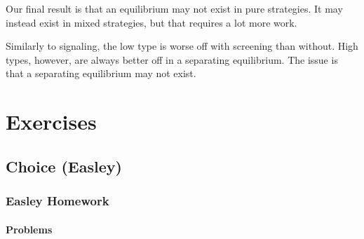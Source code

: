 \documentclass[12pt]{article}
\begin{document}
Our final result is that an equilibrium may not exist in pure strategies. It may instead exist in mixed strategies, but that requires a lot more work. 

Similarly to signaling, the low type is worse off with screening than without. High types, however, are always better off in a separating equilibrium. The issue is that a separating equilibrium may not exist.








































\newpage
\section{Exercises}\label{sec:exercises}

\subsection{Choice (Easley)}

\subsubsection{Easley Homework}

\paragraph{Problems}
\end{document}
